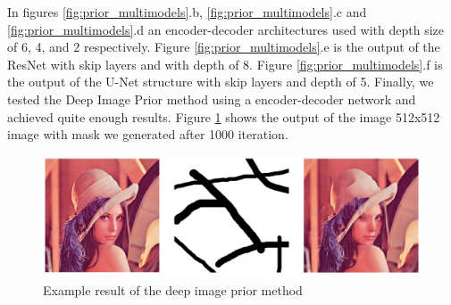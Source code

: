 In figures \ref{fig:prior_multimodels}.b, \ref{fig:prior_multimodels}.c and \ref{fig:prior_multimodels}.d an encoder-decoder architectures used with depth size of 6, 4, and 2 respectively. Figure \ref{fig:prior_multimodels}.e is the output of the ResNet with skip layers and with depth of 8. Figure \ref{fig:prior_multimodels}.f is the output of the U-Net structure with skip layers and depth of 5. Finally, we tested the Deep Image Prior method using a encoder-decoder network and achieved quite enough results. Figure \ref{fig:prior_lenna} shows the output of the image 512x512 image with mask we generated after 1000 iteration.

\begin{figure}[h]
    \centering
    \includegraphics[width=13cm]{figures/chapter4/impriorout.png}
    \caption{Example result of the deep image prior method}
    \label{fig:prior_lenna}
\end{figure}